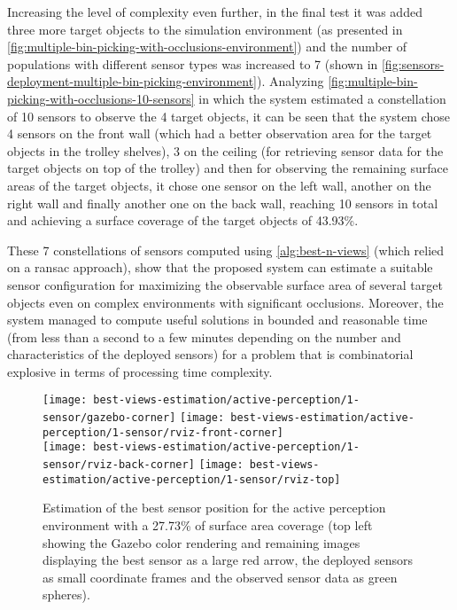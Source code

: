 Increasing the level of complexity even further, in the final test it was added three more target objects to the simulation environment (as presented in \cref{fig:multiple-bin-picking-with-occlusions-environment}) and the number of populations with different sensor types was increased to 7 (shown in \cref{fig:sensors-deployment-multiple-bin-picking-environment}). Analyzing \cref{fig:multiple-bin-picking-with-occlusions-10-sensors} in which the system estimated a constellation of 10 sensors to observe the 4 target objects, it can be seen that the system chose 4 sensors on the front wall (which had a better observation area for the target objects in the trolley shelves), 3 on the ceiling (for retrieving sensor data for the target objects on top of the trolley) and then for observing the remaining surface areas of the target objects, it chose one sensor on the left wall, another on the right wall and finally another one on the back wall, reaching 10 sensors in total and achieving a surface coverage of the target objects of 43.93\%.

These 7 constellations of sensors computed using \cref{alg:best-n-views} (which relied on a \gls{ransac} approach), show that the proposed system can estimate a suitable sensor configuration for maximizing the observable surface area of several target objects even on complex environments with significant occlusions. Moreover, the system managed to compute useful solutions in bounded and reasonable time (from less than a second to a few minutes depending on the number and characteristics of the deployed sensors) for a problem that is combinatorial explosive in terms of processing time complexity.

\begin{figure}
	\centering
	\texttt{[image: best-views-estimation/active-perception/1-sensor/gazebo-corner]}\hspace{4em}
	\texttt{[image: best-views-estimation/active-perception/1-sensor/rviz-front-corner]}\\
	\texttt{[image: best-views-estimation/active-perception/1-sensor/rviz-back-corner]}\hspace{2em}
	\texttt{[image: best-views-estimation/active-perception/1-sensor/rviz-top]}
	\caption{Estimation of the best sensor position for the active perception environment with a 27.73\% of surface area coverage (top left showing the Gazebo color rendering and remaining images displaying the best sensor as a large red arrow, the deployed sensors as small coordinate frames and the observed sensor data as green spheres).}
	\label{fig:active-perception-1-sensor}
\end{figure}


